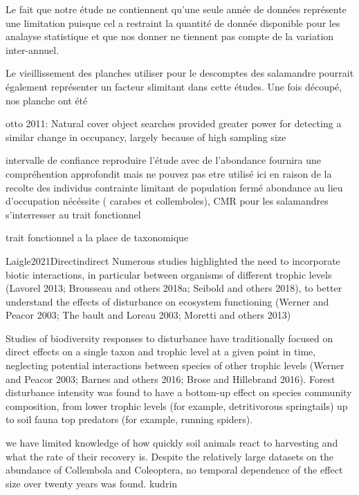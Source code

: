 Le fait que notre étude ne contiennent qu'une seule année de données représente une limitation puisque cel a restraint la quantité de donnée disponible pour les analayse statistique  et que 
nos donner ne tiennent pas compte de la variation inter-annuel. 

Le vieillissement des planches utiliser pour le descomptes des salamandre pourrait également représenter un facteur slimitant dans cette études. Une fois découpé, nos planche ont été 

  otto 2011:
  Natural cover object searches provided greater power for detecting a similar change in occupancy, largely because of high sampling size

    intervalle de confiance
  reproduire l'étude avec de l'abondance fournira une compréhention approfondit mais ne pouvez pas etre utilisé ici en raison de la recolte des individus
  contrainte limitant de population fermé
  abondance au lieu d'occupation nécéssite ( carabes et collemboles), CMR pour les salamandres
  s'interresser au trait fonctionnel 

  trait fonctionnel a la place de taxonomique



Laigle2021Directindirect
Numerous studies highlighted the need to incorporate biotic interactions, in particular between organisms of different trophic levels (Lavorel 2013; Brousseau and others 2018a; Seibold and others 2018), to better understand the effects of disturbance on ecosystem functioning (Werner and Peacor 2003; The bault and Loreau 2003; Moretti and others 2013)

Studies of biodiversity responses to disturbance have traditionally focused on direct effects on a single taxon and trophic level at a given point in time, neglecting potential interactions between species of other trophic levels (Werner and Peacor 2003; Barnes and others 2016; Brose and Hillebrand 2016).
Forest disturbance intensity was found to have a bottom-up effect on species community composition, from lower trophic levels (for example, detritivorous springtails) up to soil fauna top predators (for example, running spiders).


  we have limited knowledge of how quickly soil animals react to harvesting and what the rate of their recovery is.
  Despite the relatively large datasets on the abundance of Collembola and Coleoptera, no temporal dependence of the effect size over twenty years was found. kudrin


